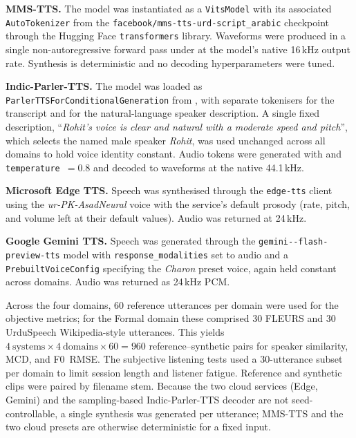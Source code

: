 \documentclass[a4paper,fleqn]{cas-dc}
\begin{document}
    \begin{sloppypar}
    \indent\textbf{MMS-TTS.} The model was instantiated as a \texttt{Vits\-Model}
    with its associated \texttt{Auto\-Tokenizer} from the
    \texttt{facebook/\-mms-\-tts-\-urd-\-script\_arabic} checkpoint through the Hugging Face
    \texttt{transformers} library. Waveforms were produced in a single
    non-autoregressive forward pass under  at the model's
    native 16\,kHz output rate. Synthesis is deterministic and no decoding
    hyperparameters were tuned.
    
    \indent\textbf{Indic-Parler-TTS.} The model was loaded as
    \texttt{Parler\-TTS\-For\-Conditional\-Generation} from
    , with separate tokenisers for the transcript
    and for the natural-language speaker description. A single fixed description,
    ``\textit{Rohit's voice is clear and natural with a moderate speed and pitch}'',
    which selects the named male speaker \textit{Rohit}, was used unchanged across
    all domains to hold voice identity constant. Audio tokens were generated with
     and \texttt{temperature}~$=0.8$ and decoded to waveforms
    at the native 44.1\,kHz.
    
    \indent\textbf{Microsoft Edge TTS.} Speech was synthesised through the
    \texttt{edge-tts} client using the \textit{ur-PK-AsadNeural} voice with the
    service's default prosody (rate, pitch, and volume left at their default
    values). Audio was returned at 24\,kHz.
    
    
    \indent\textbf{Google Gemini TTS.} Speech was generated through the
    \texttt{gemini--\allowbreak flash-\allowbreak preview-\allowbreak tts}
    model with
    \texttt{response\_\allowbreak modalities} set to audio and a
    \texttt{Prebuilt\-Voice\-Config} specifying the \textit{Charon} preset voice, again
    held constant across domains. Audio was returned as 24\,kHz PCM.
    
    Across the four domains, 60 reference utterances per domain were used for the
    objective metrics; for the Formal domain these comprised 30 FLEURS
    and 30 UrduSpeech Wikipedia-style utterances. This yields
    $4~\text{systems} \times 4~\text{domains} \times 60 = 960$ reference--synthetic
    pairs for speaker similarity, MCD, and F0~RMSE. The subjective listening tests
    used a 30-utterance subset per domain to limit session length and listener
    fatigue. Reference and synthetic clips were paired by filename stem. Because the
    two cloud services (Edge, Gemini) and the sampling-based Indic-Parler-TTS decoder
    are not seed-controllable, a single synthesis was generated per utterance;
    MMS-TTS and the two cloud presets are otherwise deterministic for a fixed input.
    \end{sloppypar}
    
\end{document}
